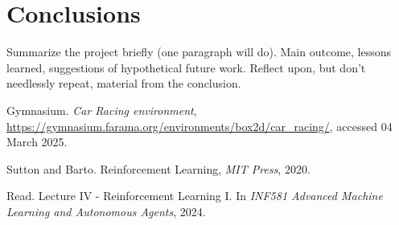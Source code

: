 \documentclass[../CSC_52081_EP.tex]{subfiles}
\begin{document}
    \section{Conclusions}
        Summarize the project briefly (one paragraph will do). Main outcome, lessons learned, suggestions of hypothetical future work.
        Reflect upon, but don't needlessly repeat, material from the conclusion.

    \begin{thebibliography}{4}
            Gymnasium. \textit{Car Racing environment}, \url{https://gymnasium.farama.org/environments/box2d/car_racing/}, accessed 04 March 2025.

        Sutton and Barto. Reinforcement Learning,
        {\em MIT Press}, 2020.

            Read. Lecture IV - Reinforcement Learning I. In \textit{INF581 Advanced Machine Learning and Autonomous Agents}, 2024.

    \end{thebibliography}
\end{document}
